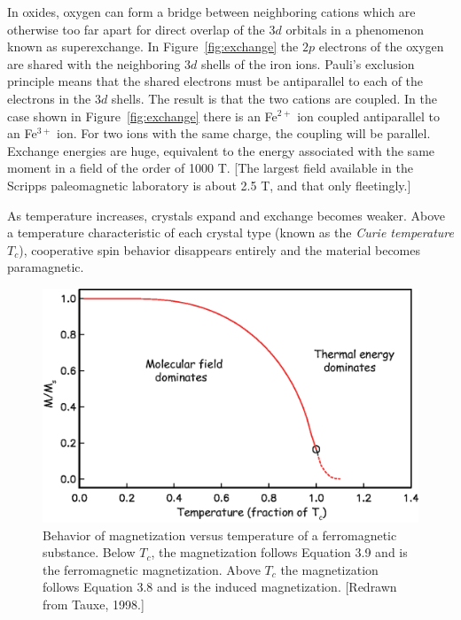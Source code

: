 {In oxides, oxygen can form a bridge between neighboring cations which are otherwise too far apart for direct overlap of the $3d$ orbitals in a phenomenon known as superexchange.  In Figure~\ref{fig:exchange} the $2p$ electrons of the oxygen are shared with the neighboring $3d$ shells of the iron ions.  Pauli's exclusion principle means that the shared electrons must be antiparallel to each of  the electrons in the $3d$ shells.  The result is that the two cations are coupled.  In the case shown in Figure~\ref{fig:exchange} there is an Fe$^{2+}$ ion coupled antiparallel to an Fe$^{3+}$ ion.  For two ions with the same charge, the coupling will be parallel.  Exchange energies are huge, equivalent to the energy associated with the same moment in  a field of the order of 1000 T.  [The largest field available in the Scripps paleomagnetic laboratory is about 2.5 T, and that only fleetingly.]
 

 
As temperature increases,  crystals expand and exchange  becomes weaker.
 Above a temperature characteristic of
 each crystal type (known as the
  {\it Curie temperature}
 $T_c$), cooperative spin  behavior disappears entirely and the material becomes 
paramagnetic.  

 
\begin{figure}[htb]
\centering  \includegraphics[width=12 cm]{EPSfiles/MsT.eps}
\caption{Behavior of magnetization versus temperature of a ferromagnetic
substance.  Below $T_c$, the magnetization follows Equation 3.9 and is the ferromagnetic magnetization.  Above $T_c$  the magnetization follows Equation 3.8 and is the induced magnetization. [Redrawn from Tauxe, 1998.]  }
\label{fig:MsT}
\end{figure}
\nocite{tauxe98}

}
